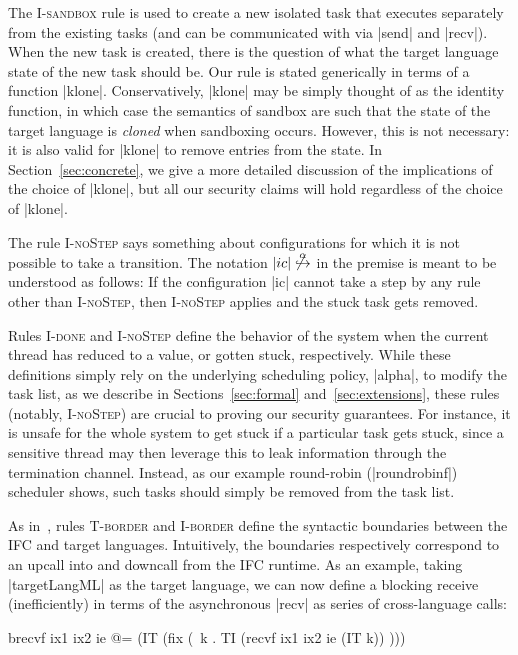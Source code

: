 The \textsc{I-sandbox} rule is used to create a new isolated task that
executes separately from the existing tasks (and can be communicated
with via |send| and |recv|).  When the new task is created, there
is the question of what the target language state of the new task should
be.  Our rule is stated generically in terms of a function |klone|.
Conservatively, |klone| may be simply thought of as the identity
function, in which
case the semantics of sandbox are such that the state of the target language is \emph{cloned}
when sandboxing occurs.  However, this is not necessary: it is also valid for |klone|
to remove entries from the state.  In Section~\ref{sec:concrete}, we give a more detailed
discussion of the implications of the choice of |klone|, but all our
security claims will hold regardless of the choice of |klone|.

The rule \textsc{I-noStep} says something about configurations for which
it is not possible to take a transition.  The notation
$|ic|\not\overset{\alpha}{\hookrightarrow}$ in the premise
is meant to be understood as
follows:  If the configuration |ic| cannot take a step by any rule other
than \textsc{I-noStep}, then \textsc{I-noStep} applies and the
stuck task gets removed.

Rules \textsc{I-done} and \textsc{I-noStep} define the behavior of the system
when the current thread has reduced to a value, or gotten stuck, respectively.
%
While these definitions simply rely on the underlying scheduling policy,
|alpha|, to modify the task list, as we describe in Sections~\ref{sec:formal}
and~\ref{sec:extensions}, these rules (notably, \textsc{I-noStep}) are crucial
to proving our security guarantees.
%
For instance, it is unsafe for the whole system to get stuck if a particular
task gets stuck, since a sensitive thread may then leverage this to leak
information through the termination channel.
%
Instead, as our example round-robin (|roundrobinf|) scheduler shows,
such tasks should simply be removed from the task list.

%
As in~\cite{Matthews:2007:OSM:1190216.1190220}, rules \textsc{T-border} and
\textsc{I-border} define the syntactic boundaries between the IFC and target
languages.
%
Intuitively, the boundaries respectively correspond to an upcall into and
downcall from the IFC runtime.
%
As an example, taking |targetLangML| as the target language, we can now define a
blocking receive (inefficiently) in terms of the asynchronous |recv| as series
of cross-language calls:
\begin{code}
brecvf ix1 ix2 ie @= (IT (fix (\ k . TI (recvf ix1 ix2 ie (IT k)) )))
\end{code}


